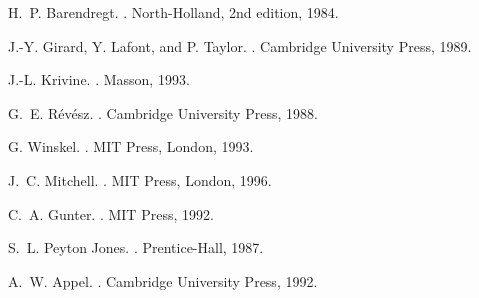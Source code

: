 \documentclass[12pt]{article}
\begin{document}
\renewcommand{\refname}{\vspace{-5ex}}

\begin{thebibliography}{1}

H.~P. Barendregt.
.
\newblock North-Holland, 2nd edition, 1984.


J.-Y. Girard, Y. Lafont, and P. Taylor.
.
\newblock Cambridge University Press, 1989.

J.-L. Krivine.
.
\newblock Masson, 1993.

G.~E. R\'ev\'esz.
.
\newblock Cambridge University Press, 1988.

G. Winskel.
. 
\newblock MIT Press, London, 1993.

J.~C. Mitchell.
.
\newblock MIT Press, London, 1996.

C.~A. Gunter.
.
\newblock MIT Press, 1992.

S.~L. Peyton Jones.
.
\newblock Prentice-Hall, 1987.

A.~W. Appel.
.
\newblock Cambridge University Press, 1992.

\end{thebibliography}
\end{document}
